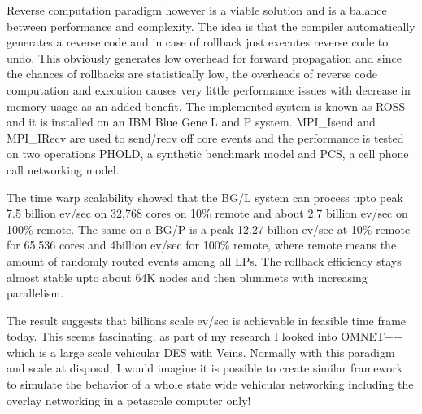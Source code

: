\documentclass[a4paper,12 pt]{article}
\begin{document}
Reverse computation paradigm however is a viable solution and is a balance between performance and complexity. The idea is that the compiler automatically generates a reverse code and in case of rollback just executes reverse code to undo. This obviously generates low overhead for forward propagation and since the chances of rollbacks are statistically low, the overheads of reverse code computation and execution causes very little performance issues with decrease in memory usage as an added benefit. The implemented system is known as ROSS and it is installed on an IBM Blue Gene L and P system. MPI\_Isend and MPI\_IRecv are used to send/recv off core events and the performance is tested on two operations PHOLD, a synthetic benchmark model and PCS, a cell phone call networking model.

The time warp scalability showed that the BG/L system can process upto peak 7.5 billion ev/sec on 32,768 cores on 10\% remote and about 2.7 billion ev/sec on 100\% remote. The same on a BG/P is a peak 12.27 billion ev/sec at 10\% remote for 65,536 cores and 4billion ev/sec for 100\% remote, where remote means the amount of randomly routed events among all LPs. The rollback efficiency stays almost stable upto about 64K nodes and then plummets with increasing parallelism.

The result suggests that billions scale ev/sec is achievable in feasible time frame today. This seems fascinating, as part of my research I looked into OMNET++ which is a large scale vehicular DES with Veins. Normally with this paradigm and scale at disposal, I would imagine it is possible to create similar framework to simulate the behavior of a whole state wide vehicular networking including the overlay networking in a petascale computer only!
\end{document}
